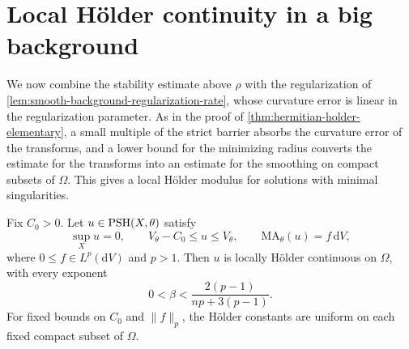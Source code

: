 \section{Local H\"older continuity in a big background}
\label{sec:big-minimal-holder}

We now combine the stability estimate above $\rho$ with the regularization of \cref{lem:smooth-background-regularization-rate}, whose curvature error is linear in the regularization parameter. As in the proof of \cref{thm:hermitian-holder-elementary}, a small multiple of the strict barrier absorbs the curvature error of the transforms, and a lower bound for the minimizing radius converts the estimate for the transforms into an estimate for the smoothing on compact subsets of $\Omega$. This gives a local H\"older modulus for solutions with minimal singularities.

\begin{theorem}\label{thm:big-minimal-holder}
Fix $C_0>0$. Let $u\in\mathrm{PSH}(X,\theta)$ satisfy
\[
 \sup_Xu=0,\qquad V_\theta-C_0\leq u\leq V_\theta,
 \qquad\mathrm{MA}_\theta(u)=f\,\mathrm{d}V,
\]
where $0\leq f\in L^p(\mathrm{d}V)$ and $p>1$. Then $u$ is locally H\"older continuous on $\Omega$, with every exponent
\[
 0<\beta<\frac{2(p-1)}{np+3(p-1)}.
\]
For fixed bounds on $C_0$ and $\|f\|_p$, the H\"older constants are uniform on each fixed compact subset of $\Omega$.
\end{theorem}

